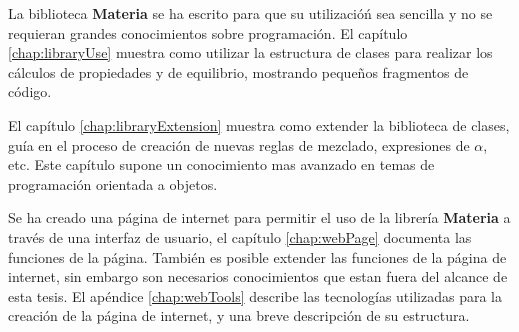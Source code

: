 	La biblioteca \textbf{Materia} se ha escrito para que su utilizacióń sea sencilla y no se requieran grandes conocimientos sobre programación. El capítulo \ref{chap:libraryUse} muestra como utilizar la estructura de clases para realizar los cálculos de propiedades y de equilibrio, mostrando pequeños fragmentos de código.

	El capítulo \ref{chap:libraryExtension} muestra como extender la biblioteca de clases, guía en el proceso de creación de nuevas reglas de mezclado, expresiones de $\alpha$, etc. Este capítulo supone un conocimiento mas avanzado en temas de programación orientada a objetos.

	Se ha creado una página de internet para permitir el uso de la librería \textbf{Materia} a través de una interfaz de usuario, el capítulo \ref{chap:webPage} documenta las funciones de la página. También es posible extender las funciones de la página de internet, sin embargo son necesarios conocimientos que estan fuera del alcance de esta tesis. El apéndice \ref{chap:webTools} describe las tecnologías utilizadas para la creación de la página de internet, y una breve descripción de su estructura.
	